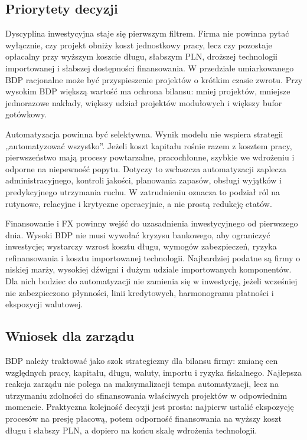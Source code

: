 \subsection{Priorytety decyzji}

Dyscyplina inwestycyjna staje się pierwszym filtrem. Firma nie powinna pytać wyłącznie, czy projekt obniży koszt jednostkowy pracy, lecz czy pozostaje opłacalny przy wyższym koszcie długu, słabszym PLN, droższej technologii importowanej i słabszej dostępności finansowania. W przedziale umiarkowanego BDP racjonalne może być przyspieszenie projektów o krótkim czasie zwrotu. Przy wysokim BDP większą wartość ma ochrona bilansu: mniej projektów, mniejsze jednorazowe nakłady, większy udział projektów modułowych i większy bufor gotówkowy.

Automatyzacja powinna być selektywna. Wynik modelu nie wspiera strategii „automatyzować wszystko”. Jeżeli koszt kapitału rośnie razem z kosztem pracy, pierwszeństwo mają procesy powtarzalne, pracochłonne, szybkie we wdrożeniu i odporne na niepewność popytu. Dotyczy to zwłaszcza automatyzacji zaplecza administracyjnego, kontroli jakości, planowania zapasów, obsługi wyjątków i predykcyjnego utrzymania ruchu. W zatrudnieniu oznacza to podział ról na rutynowe, relacyjne i krytyczne operacyjnie, a nie prostą redukcję etatów.

Finansowanie i FX powinny wejść do uzasadnienia inwestycyjnego od pierwszego dnia. Wysoki BDP nie musi wywołać kryzysu bankowego, aby ograniczyć inwestycje; wystarczy wzrost kosztu długu, wymogów zabezpieczeń, ryzyka refinansowania i kosztu importowanej technologii. Najbardziej podatne są firmy o niskiej marży, wysokiej dźwigni i dużym udziale importowanych komponentów. Dla nich bodziec do automatyzacji nie zamienia się w inwestycję, jeżeli wcześniej nie zabezpieczono płynności, linii kredytowych, harmonogramu płatności i ekspozycji walutowej.

\subsection{Wniosek dla zarządu}

BDP należy traktować jako szok strategiczny dla bilansu firmy: zmianę cen względnych pracy, kapitału, długu, waluty, importu i ryzyka fiskalnego. Najlepsza reakcja zarządu nie polega na maksymalizacji tempa automatyzacji, lecz na utrzymaniu zdolności do sfinansowania właściwych projektów w odpowiednim momencie. Praktyczna kolejność decyzji jest prosta: najpierw ustalić ekspozycję procesów na presję płacową, potem odporność finansowania na wyższy koszt długu i słabszy PLN, a dopiero na końcu skalę wdrożenia technologii.
